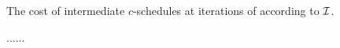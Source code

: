 \begin{figure}
\caption{The cost of intermediate $c$-schedules at iterations of \algonameapx  according to $\mathcal{I}$.}\label{fig:conv}
\end{figure}


\begin{figure}
	\caption{......} \label{fig:D100}
\end{figure}


